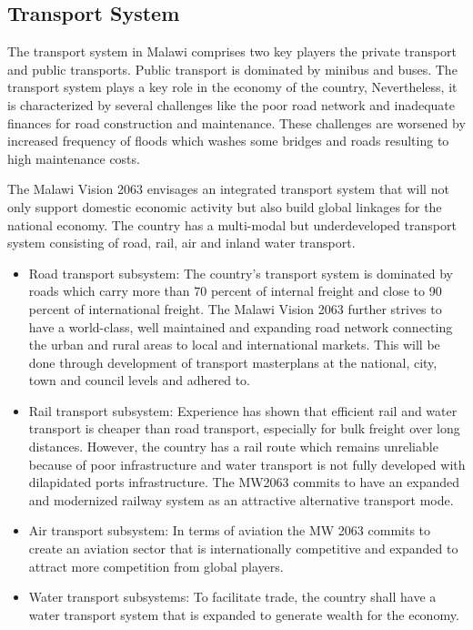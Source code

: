 \documentclass[
]{book}
\begin{document}
\hypertarget{transport-system}{%
\subsection{Transport System}\label{transport-system}}

The transport system in Malawi comprises two key players the private transport and public transports. Public transport is dominated by minibus and buses. The transport system plays a key role in the economy of the country, Nevertheless, it is characterized by several challenges like the poor road network and inadequate finances for road construction and maintenance. These challenges are worsened by increased frequency of floods which washes some bridges and roads resulting to high maintenance costs.

The Malawi Vision 2063 envisages an integrated transport system that will not only support domestic economic activity but also build global linkages for the national economy. The country has a multi-modal but underdeveloped transport system consisting of road, rail, air and inland water transport.

\begin{itemize}
\item
  Road transport subsystem: The country's transport system is dominated by roads which carry more than 70 percent of internal freight and close to 90 percent of international freight. The Malawi Vision 2063 further strives to have a world-class, well maintained and expanding road network connecting the urban and rural areas to local and international markets. This will be done through development of transport masterplans at the national, city, town and council levels and adhered to.
\item
  Rail transport subsystem: Experience has shown that efficient rail and water transport is cheaper than road transport, especially for bulk freight over long distances. However, the country has a rail route which remains unreliable because of poor infrastructure and water transport is not fully developed with dilapidated ports infrastructure. The MW2063 commits to have an expanded and modernized railway system as an attractive alternative transport mode.
\item
  Air transport subsystem: In terms of aviation the MW 2063 commits to create an aviation sector that is internationally competitive and expanded to attract more competition from global players.
\item
  Water transport subsystems: To facilitate trade, the country shall have a water transport system that is expanded to generate wealth for the economy.
\end{itemize}
\end{document}
